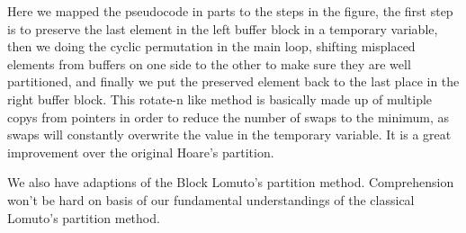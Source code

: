 \documentclass{article}
\begin{document}
Here we mapped the pseudocode in parts to the steps in the figure, the first step is to preserve the last element in the left buffer block in a temporary variable,
then we doing the cyclic permutation in the main loop, shifting misplaced elements from buffers on one side to the other to make sure they are well partitioned, and finally we put the preserved element back to the last place in the right buffer block.
This rotate-n like method is basically made up of multiple copys from pointers in order to reduce the number of swaps to the minimum, as swaps will constantly overwrite the value in the temporary variable. It is a great improvement over the original Hoare's partition.

We also have adaptions of the Block Lomuto's partition method. Comprehension won't be hard on basis of our fundamental understandings of the classical Lomuto's partition method.
\end{document}
